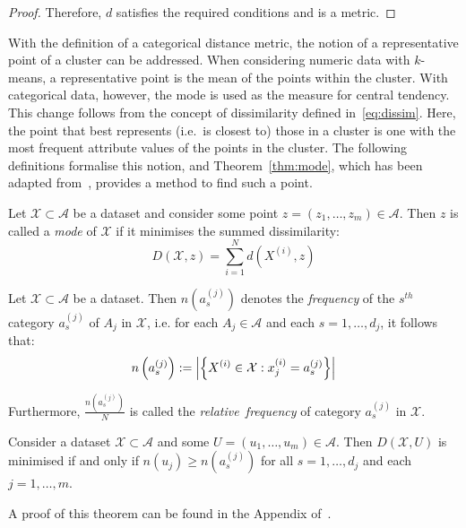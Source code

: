 \begin{theorem}
\begin{proof}
        Therefore, \(d\) satisfies the required conditions and is a metric.
    \end{proof}
\end{theorem}

With the definition of a categorical distance metric, the notion of a
representative point of a cluster can be addressed. When considering numeric
data with \(k\)-means, a representative point is the mean of the points within
the cluster. With categorical data, however, the mode is used as the measure for
central tendency. This change follows from the concept of dissimilarity defined
in~\eqref{eq:dissim}. Here, the point that best represents (i.e.\ is closest to)
those in a cluster is one with the most frequent attribute values of the points
in the cluster. The following definitions formalise this notion, and
Theorem~\ref{thm:mode}, which has been adapted from~\cite{Huang1998}, provides a
method to find such a point.

\begin{definition}\label{def:mode}
    Let \(\mathcal{X} \subset \mathcal{A}\) be a dataset and consider some point
    \(z = \left(z_1, \ldots, z_m\right) \in \mathcal{A}\). Then \(z\) is called
    a \emph{mode} of \(\mathcal{X}\) if it minimises the summed dissimilarity:
    \begin{equation}\label{eq:summed-dissim}
        D\left(\mathcal{X}, z\right) = \sum_{i=1}^{N} d\left(X^{(i)}, z\right)
    \end{equation}
\end{definition}

\begin{definition}\label{def:rel-freq}
    Let \(\mathcal{X} \subset \mathcal{A}\) be a dataset. Then
    \(n\left(a_s^{(j)}\right)\) denotes the \emph{frequency} of the \(s^{th}\)
    category \(a_s^{(j)}\) of \(A_j\) in \(\mathcal{X}\), i.e. for each \(A_j
    \in \mathcal{A}\) and each \(s = 1, \ldots, d_j\), it follows that:
    \begin{equation}
        n\left(a_s^{(j)}\right) := \abs*{%
            {\left\{X^{(i)} \in \mathcal{X}: x_j^{(i)} = a_s^{(j)}\right\}}
        }
    \end{equation}

    Furthermore, \(\frac{n\left(a_s^{(j)}\right)}{N}\) is called the
    \emph{relative~frequency} of category \(a_s^{(j)}\) in \(\mathcal{X}\).
\end{definition}

\begin{theorem}\label{thm:mode}
    Consider a dataset \(\mathcal{X} \subset \mathcal{A}\) and some \(U = (u_1,
    \ldots, u_m) \in \mathcal{A}\). Then \(D(\mathcal{X}, U)\) is minimised if
    and only if \(n\left(u_j\right) \geq n\left(a_s^{(j)}\right)\) for all
    \(s=1, \ldots, d_j\) and each \(j = 1, \ldots, m\).

    A proof of this theorem can be found in the Appendix of~\cite{Huang1998}.
\end{theorem}

